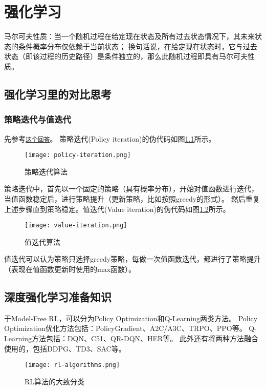 \chapter{强化学习}
马尔可夫性质：当一个随机过程在给定现在状态及所有过去状态情况下，其未来状态的条件概率分布仅依赖于当前状态；
换句话说，在给定现在状态时，它与过去状态（即该过程的历史路径）是条件独立的，那么此随机过程即具有马尔可夫性质。

\section{强化学习里的对比思考}
\subsection{策略迭代与值迭代}
先参考\href{https://zhuanlan.zhihu.com/p/55217561}{\texttt{这个回答}}。
策略迭代(Policy iteration)的伪代码如图\ref{fig: policy-iteration}所示。
\begin{figure}[htbp]
	\figskip 
	\centering
	\texttt{[image: policy-iteration.png]}	  
	\caption{\label{fig: policy-iteration} 策略迭代算法}
\end{figure}
策略迭代中，首先以一个固定的策略（具有概率分布），开始对值函数进行迭代，当值函数稳定后，进行策略提升（更新策略，比如按照greedy的形式）。
然后重复上述步骤直到策略稳定。值迭代(Value iteration)的伪代码如图\ref{fig: value-iteration}所示。
\begin{figure}[htbp]
	\figskip 
	\centering
	\texttt{[image: value-iteration.png]}	  
	\caption{\label{fig: value-iteration} 值迭代算法}
\end{figure}
值迭代可以认为策略只选择greedy策略，每做一次值函数迭代，都进行了策略提升（表现在值函数更新时使用的max函数）。


\section{深度强化学习准备知识}
于Model-Free RL，可以分为Policy Optimization和Q-Learning两类方法。
Policy Optimization优化方法包括：PolicyGradient、A2C/A3C、TRPO、PPO等。
Q-Learning方法包括：DQN、C51、QR-DQN、HER等。
此外还有将两种方法融合使用的，包括DDPG、TD3、SAC等。

\begin{figure}[htbp]
	\figskip 
	\centering
	\texttt{[image: rl-algorithms.png]}	  
	\caption{\label{fig: rl} RL算法的大致分类}
\end{figure}

